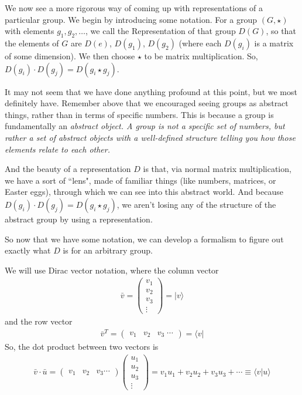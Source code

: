 \documentclass[12pt,epsf]{article}
\def\nolabel{\nonumber }
\def\nolabel{\nonumber }
\begin{document}
We now see a more rigorous way of coming up with representations of a
particular group.  We begin by introducing some notation.  For a group
$(G,\star)$ with elements $g_1,g_2,\ldots$, we call the
Representation of that group $D(G)$, so that the elements of $G$
are $D(e)$, $D(g_1)$, $D(g_2)$ (where each $D(g_i)$ is a matrix of some
dimension).  We then choose $\star$ to be matrix multiplication.  So,
$D(g_i) \cdot D(g_j) = D(g_i \star g_j)$.  

It may not seem that we have done anything profound at this point, but
we most definitely have.  Remember above that we encouraged seeing
groups as abstract things, rather than in terms of specific numbers. 
This is because a group is fundamentally an \it abstract \rm object.  A
group is not a specific set of numbers, but rather a set of abstract
objects with a well-defined structure telling you how those elements
relate to each other.  

And the beauty of a representation $D$ is that, via normal matrix
multiplication, we have a sort of ``lens", made of familiar things
(like numbers, matrices, or Easter eggs), through which we can see into
this abstract world.  And because $D(g_i)\cdot D(g_j) = D(g_i \star
g_j)$, we aren't losing any of the structure of the abstract group by
using a representation.  

So now that we have some notation, we can develop a formalism to figure
out exactly what $D$ is for an arbitrary group.  

We will use Dirac vector notation, where the column vector
\begin{eqnarray}
\bar v = 
\begin{pmatrix}
v_1 \\ v_2 \\ v_3 \\ \vdots
\end{pmatrix}
 = |v \rangle \nolabel
\end{eqnarray}
and the row vector
\begin{eqnarray}
\bar v^T = 
\begin{pmatrix}
v_1 & v_2 & v_3 \; \cdots
\end{pmatrix}
 = \langle v | \nolabel 
\end{eqnarray}
So, the dot product between two vectors is
\begin{eqnarray}
\bar v \cdot \bar u = 
\begin{pmatrix}
v_1 & v_2 & v_3 \cdots
\end{pmatrix}
\begin{pmatrix}
u_1 \\ u_2 \\ u_3 \\ \vdots
\end{pmatrix} = v_1u_1+ v_2u_2+v_3u_3+\cdots \equiv \langle v | u
\rangle \nolabel 
\end{eqnarray}
\end{document}

